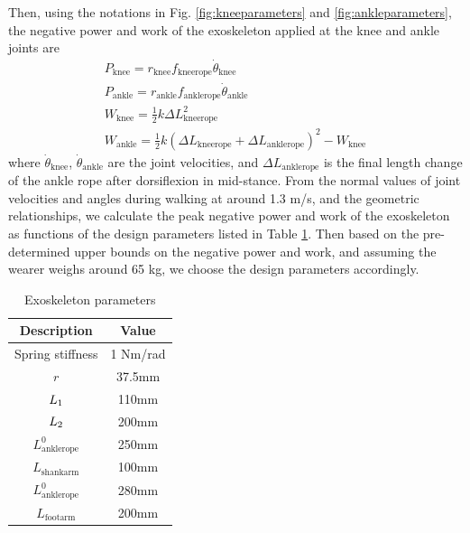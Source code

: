 \documentclass[twocolumn,cleanfoot,10pt]{asme2ej}
\begin{document}
Then, using the notations in Fig. \ref{fig:kneeparameters} and \ref{fig:ankleparameters}, the negative power and work of the exoskeleton applied at the knee and ankle joints are
\begin{gather}
	P_\mathrm{knee} = r_\mathrm{knee}f_\mathrm{kneerope}\dot{\theta}_\mathrm{knee} \\
	P_\mathrm{ankle} = r_\mathrm{ankle}f_\mathrm{anklerope}\dot{\theta}_\mathrm{ankle} \\
	W_\mathrm{knee} = \frac{1}{2}k\Delta L_\mathrm{kneerope}^2 \\
	W_\mathrm{ankle} = \frac{1}{2}k(\Delta L_\mathrm{kneerope}+\Delta L_\mathrm{anklerope})^2 - W_\mathrm{knee}
\end{gather}
where $\dot{\theta}_\mathrm{knee}$, $\dot{\theta}_\mathrm{ankle}$ are the joint velocities, and $\Delta L_\mathrm{anklerope}$ is the final length change of the ankle rope after dorsiflexion in mid-stance.
From the normal values of joint velocities and angles during walking at around 1.3 m/s, and the geometric relationships, we calculate the peak negative power and work of the exoskeleton as functions of the design parameters listed in Table \ref{tab:Exoskeleton parameters}.
Then based on the pre-determined upper bounds on the negative power and work, and assuming the wearer weighs around 65 kg, we choose the design parameters accordingly.



\begin{table}[t]
	\caption{Exoskeleton parameters}
	\begin{center}
		\label{tab:Exoskeleton parameters}
		\begin{tabular}{c c}	
			\hline
			\textbf{Description } & \textbf{Value} \\
			\hline
			Spring stiffness & 1 Nm/rad\\
			$r$ & 37.5mm\\
			$L_\textrm1$ & 110mm\\
			$L_\textrm2$ & 200mm\\
			$L_\textrm{anklerope}^0$ & 250mm\\
			$L_\textrm{shankarm}$  & 100mm\\
			$L_\textrm{anklerope}^0$ & 280mm\\
			$L_\textrm{footarm}$ & 200mm\\
			\hline
		\end{tabular}
	\end{center}
\end{table}
\end{document}
